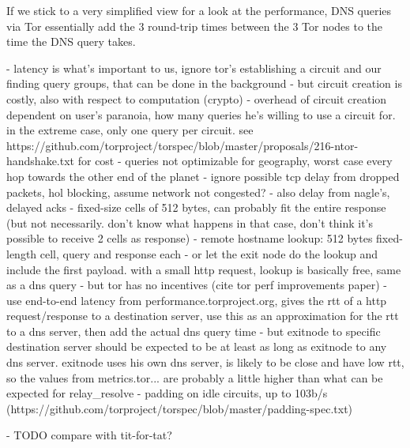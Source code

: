 If we stick to a very simplified view for a look at the performance, DNS queries
via Tor essentially add the 3 round-trip times between the 3 Tor nodes to the
time the DNS query takes.

- latency is what's important to us, ignore tor's establishing a circuit and our
  finding query groups, that can be done in the background
- but circuit creation is costly, also with respect to computation (crypto)
- overhead of circuit creation dependent on user's paranoia, how many queries
  he's willing to use a circuit for. in the extreme case, only one query per
  circuit. see
  https://github.com/torproject/torspec/blob/master/proposals/216-ntor-handshake.txt
  for cost
- queries not optimizable for geography, worst case every hop towards the other
  end of the planet
- ignore possible tcp delay from dropped packets, hol blocking, assume network
  not congested?
    - also delay from nagle's, delayed acks
- fixed-size cells of 512 bytes, can probably fit the entire response (but not
  necessarily. don't know what happens in that case, don't think it's possible
  to receive 2 cells as response)
- remote hostname lookup: 512 bytes fixed-length cell, query and response each
- or let the exit node do the lookup and include the first payload. with a small
  http request, lookup is basically free, same as a dns query
- but tor has no incentives (cite tor perf improvements paper)
- use end-to-end latency from performance.torproject.org, gives the rtt of a
  http request/response to a destination server, use this as an approximation
  for the rtt to a dns server, then add the actual dns query time
    - but exitnode to specific destination server should be expected to be at
      least as long as exitnode to any dns server. exitnode uses his own dns
      server, is likely to be close and have low rtt, so the values from
      metrics.tor... are probably a little higher than what can be expected for
      relay\_resolve
- %
  padding on idle circuits, up to 103b/s
  (https://github.com/torproject/torspec/blob/master/padding-spec.txt)

- TODO compare with tit-for-tat?
